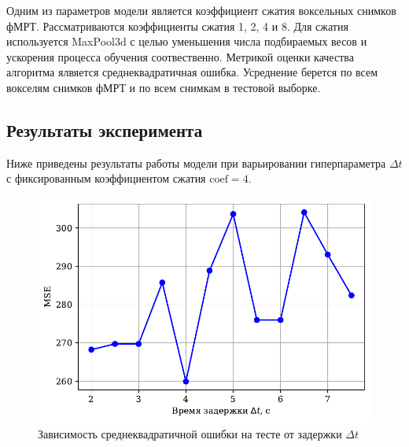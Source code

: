 \documentclass[12pt,twoside]{article}
\begin{document}
Одним из параметров модели является коэффициент сжатия воксельных снимков фМРТ. 
Рассматриваются коэффициенты сжатия 1, 2, 4 и 8.
Для сжатия используется MaxPool3d с целью уменьшения числа подбираемых весов и ускорения процесса обучения соотвественно.
Метрикой оценки качества алгоритма ялвяется среднеквадратичная ошибка.
Усреднение берется по всем вокселям снимков фМРТ и по всем снимкам в тестовой выборке.
\subsection{Результаты эксперимента}
Ниже приведены результаты работы модели при варьировании гиперпараметра $\Delta t$ с фиксированным коэффициентом сжатия $\mathrm{coef} = 4$. 
\begin{figure}[h!]
    \centering
    \includegraphics[scale = 0.8]{MSE_dt.pdf}
    \caption{Зависимость среднеквадратичной ошибки на тесте от задержки ${\Delta t}$}
    \label{MSE_dt}
\end{figure}
\end{document}
